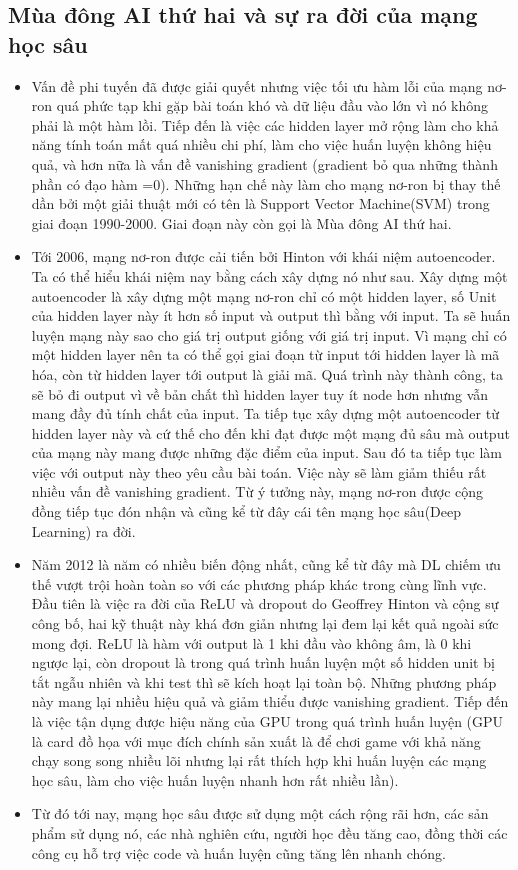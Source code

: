 \subsection{Mùa đông AI thứ hai và sự ra đời của mạng học sâu}
\begin{itemize}
\item Vấn đề phi tuyến đã được giải quyết nhưng việc tối ưu hàm lỗi của mạng nơ-ron quá phức tạp khi gặp bài toán khó và dữ liệu đầu vào lớn vì nó không phải là một hàm lồi. Tiếp đến là việc các hidden layer mở rộng làm cho khả năng tính toán mất quá nhiều chi phí, làm cho việc huấn luyện không hiệu quả, và hơn nữa là vấn đề vanishing gradient (gradient bỏ qua những thành phần có đạo hàm =0). Những hạn chế này làm cho mạng nơ-ron bị thay thế dần bởi một giải thuật mới có tên là Support Vector Machine(SVM) trong giai đoạn 1990-2000. Giai đoạn này còn gọi là Mùa đông AI thứ hai.
\item Tới 2006, mạng nơ-ron được cải tiến bởi Hinton với khái niệm autoencoder. Ta có thể hiểu khái niệm nay bằng cách xây dựng nó như sau. Xây dựng một autoencoder là xây dựng một mạng nơ-ron chỉ có một hidden layer, số Unit của hidden layer này ít hơn số input và output thì bằng với input. Ta sẽ huấn luyện mạng này sao cho giá trị output giống với giá trị input. Vì mạng chỉ có một hidden layer nên ta có thể gọi giai đoạn từ input tới hidden layer là mã hóa, còn từ hidden layer tới output là giải mã. Quá trình này thành công, ta sẽ bỏ đi output vì về bản chất thì hidden layer tuy ít node hơn nhưng vẫn mang đầy đủ tính chất của input. Ta tiếp tục xây dựng một autoencoder từ hidden layer này và cứ thế cho đến khi đạt được một mạng đủ sâu mà output của mạng này mang được những đặc điểm của input. Sau đó ta tiếp tục làm việc với output này theo yêu cầu bài toán. Việc này sẽ làm giảm thiếu rất nhiều vấn đề vanishing gradient. Từ ý tưởng này, mạng nơ-ron được cộng đồng tiếp tục đón nhận và cũng kể từ đây cái tên mạng học sâu(Deep Learning) ra đời.
\item Năm 2012 là năm có nhiều biến động nhất, cũng kể từ đây mà DL chiếm ưu thế vượt trội hoàn toàn so với các phương pháp khác trong cùng lĩnh vực. Đầu tiên là việc ra đời của ReLU và dropout do Geoffrey Hinton và cộng sự công bố, hai kỹ thuật này khá đơn giản nhưng lại đem lại kết quả ngoài sức mong đợi. ReLU là hàm với output là 1 khi đầu vào không âm, là 0 khi ngược lại, còn dropout là trong quá trình huấn luyện một số hidden unit bị tắt ngẫu nhiên và khi test thì sẽ kích hoạt lại toàn bộ. Những phương pháp này mang lại nhiều hiệu quả và giảm thiểu được vanishing gradient. Tiếp đến là việc tận dụng được hiệu năng của GPU trong quá trình huấn luyện (GPU là card đồ họa với mục đích chính sản xuất là để chơi game với khả năng chạy song song nhiều lõi nhưng lại rất thích hợp khi huấn luyện các mạng học sâu, làm cho việc huấn luyện nhanh hơn rất nhiều lần).
\item Từ đó tới nay, mạng học sâu được sử dụng một cách rộng rãi hơn, các sản phẩm sử dụng nó, các nhà nghiên cứu, người học đều tăng cao, đồng thời các công cụ hỗ trợ việc code và huấn luyện cũng tăng lên nhanh chóng.
\end{itemize}

